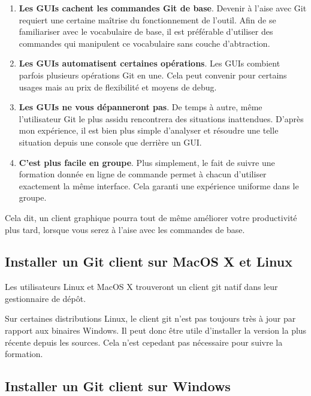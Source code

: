 \documentclass{../../common/tufte-latex/tufte-handout}
\begin{document}
\begin{enumerate} 
 \item{\textbf{Les GUIs cachent les commandes Git de base}. Devenir à l'aise avec Git requiert une certaine maîtrise du fonctionnement de l'outil. Afin de se familiariser avec le vocabulaire de base, il est préférable d'utiliser des commandes qui manipulent ce vocabulaire sans couche d'abtraction.}
 \item{\textbf{Les GUIs automatisent certaines opérations}. 
 Les GUIs combient parfois plusieurs opérations Git en une. Cela peut convenir pour certains usages mais au prix de flexibilité et moyens de debug.}
 \item{\textbf{Les GUIs ne vous dépanneront pas}. 
 De temps à autre, même l'utilisateur Git le plus assidu rencontrera des situations inattendues. D'après mon expérience, il est bien plus simple d'analyser et résoudre une telle situation depuis une console que derrière un GUI.}
 \item{\textbf{C'est plus facile en groupe}. Plus simplement, le fait de suivre une formation donnée en ligne de commande permet à chacun d'utiliser exactement la même interface. Cela garanti une expérience uniforme dans le groupe.}
\end{enumerate}

Cela dit, un client graphique pourra tout de même améliorer votre productivité plus tard, lorsque vous serez à l'aise avec les commandes de base.

\subsection{Installer un Git client sur MacOS X et Linux}

Les utilisateurs Linux et MacOS X trouveront un client git natif dans leur gestionnaire de dépôt.

Sur certaines distributions Linux, le client git n'est pas toujours très à jour par rapport aux binaires Windows.  Il peut donc être utile d'installer la version la plus récente depuis les sources. Cela n'est cepedant pas nécessaire pour suivre la formation.

\subsection{Installer un Git client sur Windows}\label{sec:preparation}
\end{document}
